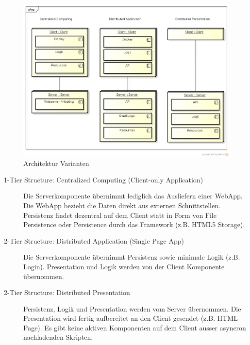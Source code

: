 		\begin{figure}[H]
			\includegraphics[width=\textwidth]{architecture/media/img/tierArchitecture.png}
			\centering
			\caption{Architektur Varianten}
			\label{fig:tierArchitecture}
		\end{figure}
		\begin{description}
			\item[1-Tier Structure: Centralized Computing (Client-only Application)]
				Die Serverkomponente übernimmt lediglich das Ausliefern einer WebApp. 
				Die WebApp bezieht die Daten direkt aus externen Schnittstellen. 
				Persistenz findet dezentral auf dem Client statt in Form von File Persistence oder 
				Persistence durch das Framework (z.B. HTML5 Storage).
				
			\item[2-Tier Structure: Distributed Application (Single Page App)]
				Die Serverkomponente übernimmt Persistenz sowie minimale Logik (z.B. Login).
				Presentation und Logik werden von der Client Komponente übernommen.
				
			\item[2-Tier Structure: Distributed Presentation]
				Persistenz, Logik und Presentation werden vom Server übernommen.
				Die Presentation wird fertig aufbereitet an den Client gesendet (z.B. HTML Page).
				Es gibt keine aktiven Komponenten auf dem Client ausser asyncron nachladenden Skripten.
				
		\end{description}
	
